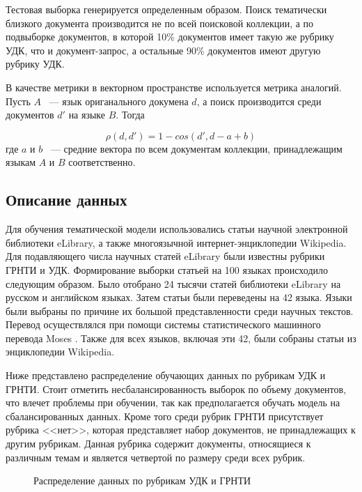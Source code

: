 \documentclass[12pt, twoside]{article}
\begin{document}
Тестовая выборка генерируется определенным образом. Поиск тематически близкого документа производится не по всей поисковой коллекции, а по подвыборке документов, в которой 10\% документов имеет такую же рубрику УДК, что и документ-запрос, а остальные 90\% документов имеют другую рубрику УДК.

В качестве метрики в векторном пространстве используется метрика аналогий. Пусть $A$ ~--- язык ориганального докумена $d$, а поиск производится среди документов $d'$ на языке $B$. Тогда 

\[\rho(d, d') = 1 - cos(d', d - a + b)\]
где $a$ и $b$ ~--- средние вектора по всем документам коллекции, принадлежащим языкам $A$ и $B$ соответственно.

\subsection{Описание данных}

Для обучения тематической модели использовались статьи научной электронной библиотеки eLibrary\cite{eLib}, а также многоязычной интернет-энциклопедии Wikipedia\cite{wiki}. %
Для подавляющего числа научных статей eLibrary были известны рубрики ГРНТИ и УДК. Формирование выборки статьей на 100 языках происходило следующим образом. Было отобрано 24 тысячи статей библиотеки eLibrary на русском и английском языках. Затем статьи были переведены на 42 языка. Языки были выбраны по причине их большой представленности среди научных текстов. Перевод осуществлялся при помощи системы статистического машинного перевода Moses \cite{Moses}. Также для всех языков, включая эти 42, были собраны статьи из энциклопедии Wikipedia.

Ниже представлено распределение обучающих данных по рубрикам УДК и ГРНТИ. Стоит отметить несбалансированность выборок по объему документов, что влечет проблемы при обучении, так как предполагается обучать модель на сбалансированных данных. Кроме того среди рубрик ГРНТИ присутствует рубрика <<нет>>, которая представляет набор документов, не принадлежащих к другим рубрикам. Данная рубрика содержит документы, относящиеся к различным темам и является четвертой по размеру среди всех рубрик.

\begin{figure}[H]
  \subfloat{}
  \subfloat{}
 \caption{Распределение данных по рубрикам УДК и ГРНТИ}
  \label{fig:1}
\end{figure}
\end{document}
